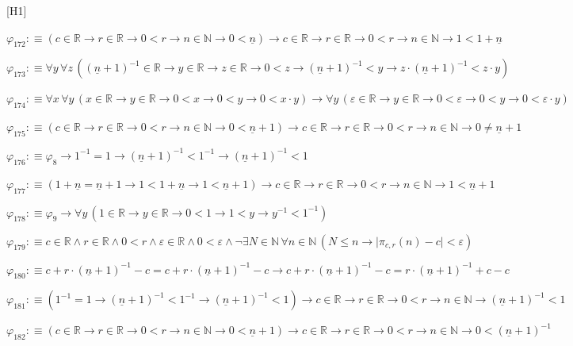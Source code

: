 \begin{fullproof}{[H1]}
\begin{abbrevlist}
\item $\varphi_{172} :\equiv (c \in \mathbb{R} \to r \in \mathbb{R} \to 0 < r \to n \in \mathbb{N} \to 0 < \underline{n}) \to c \in \mathbb{R} \to r \in \mathbb{R} \to 0 < r \to n \in \mathbb{N} \to 1 < 1 + \underline{n}$
\item $\varphi_{173} :\equiv \forall y\,\forall z\,((\underline{n} + 1)^{-1} \in \mathbb{R} \to y \in \mathbb{R} \to z \in \mathbb{R} \to 0 < z \to (\underline{n} + 1)^{-1} < y \to z \cdot (\underline{n} + 1)^{-1} < z \cdot y)$
\item $\varphi_{174} :\equiv \forall x\,\forall y\,(x \in \mathbb{R} \to y \in \mathbb{R} \to 0 < x \to 0 < y \to 0 < x \cdot y) \to \forall y\,(\varepsilon \in \mathbb{R} \to y \in \mathbb{R} \to 0 < \varepsilon \to 0 < y \to 0 < \varepsilon \cdot y)$
\item $\varphi_{175} :\equiv (c \in \mathbb{R} \to r \in \mathbb{R} \to 0 < r \to n \in \mathbb{N} \to 0 < \underline{n} + 1) \to c \in \mathbb{R} \to r \in \mathbb{R} \to 0 < r \to n \in \mathbb{N} \to 0 \neq \underline{n} + 1$
\item $\varphi_{176} :\equiv \varphi_{8} \to 1^{-1} = 1 \to (\underline{n} + 1)^{-1} < 1^{-1} \to (\underline{n} + 1)^{-1} < 1$
\item $\varphi_{177} :\equiv (1 + \underline{n} = \underline{n} + 1 \to 1 < 1 + \underline{n} \to 1 < \underline{n} + 1) \to c \in \mathbb{R} \to r \in \mathbb{R} \to 0 < r \to n \in \mathbb{N} \to 1 < \underline{n} + 1$
\item $\varphi_{178} :\equiv \varphi_{9} \to \forall y\,(1 \in \mathbb{R} \to y \in \mathbb{R} \to 0 < 1 \to 1 < y \to y^{-1} < 1^{-1})$
\item $\varphi_{179} :\equiv c \in \mathbb{R} \land r \in \mathbb{R} \land 0 < r \land \varepsilon \in \mathbb{R} \land 0 < \varepsilon \land \neg \exists N \in \mathbb{N}\,\forall n \in \mathbb{N}\,(N \leq n \to \lvert \pi_{c,r}(n) - c \rvert < \varepsilon)$
\item $\varphi_{180} :\equiv c + r \cdot (\underline{n} + 1)^{-1} - c = c + r \cdot (\underline{n} + 1)^{-1} - c \to c + r \cdot (\underline{n} + 1)^{-1} - c = r \cdot (\underline{n} + 1)^{-1} + c - c$
\item $\varphi_{181} :\equiv (1^{-1} = 1 \to (\underline{n} + 1)^{-1} < 1^{-1} \to (\underline{n} + 1)^{-1} < 1) \to c \in \mathbb{R} \to r \in \mathbb{R} \to 0 < r \to n \in \mathbb{N} \to (\underline{n} + 1)^{-1} < 1$
\item $\varphi_{182} :\equiv (c \in \mathbb{R} \to r \in \mathbb{R} \to 0 < r \to n \in \mathbb{N} \to 0 < \underline{n} + 1) \to c \in \mathbb{R} \to r \in \mathbb{R} \to 0 < r \to n \in \mathbb{N} \to 0 < (\underline{n} + 1)^{-1}$

\end{abbrevlist}
\end{fullproof}
